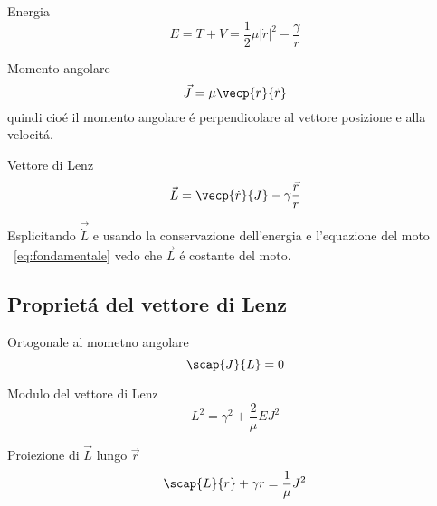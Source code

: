 \documentclass[oneside,12pt,fleqn]{memoir}
\begin{document}
\begin{enumerate*}

\item Energia\\
\begin{equation*}
E=T+V=\frac{1}{2}\mu|\dot{r}|^2-\frac{\gamma}{r}
\end{equation*}

\item Momento angolare\\
\begin{equation*}
\vec{J}=\mu\vecp{r}{\dot{r}}
\end{equation*}
quindi  cio\'e il momento angolare \'e perpendicolare al vettore posizione e alla velocit\'a.


\item Vettore di Lenz\\
\begin{equation*}\label{eq:lenzv}
\vec{L}=\vecp{\dot{r}}{J}-\gamma\frac{\vec{r}}{r}
\end{equation*}




\end{enumerate*}

Esplicitando $\vec{\dot{L}}$ e usando la conservazione dell'energia e l'equazione del moto ~\ref{eq:fondamentale} vedo che $\vec{L}$ \'e costante del moto.

\subsection{Propriet\'a del vettore di Lenz}

\begin{itemize*}
\item Ortogonale al mometno angolare
\begin{equation*}\label{eq:JLzero}
\scap{J}{L}=0
\end{equation*}

\item Modulo del vettore di Lenz
\begin{equation*}\label{eq:moduloL}
L^2=\gamma^2+\frac{2}{\mu}EJ^2
\end{equation*}

\item Proiezione di $\vec{L}$ lungo $\vec{r}$
\begin{equation*}\label{eq:Lr}
\scap{L}{r}+\gamma r=\frac{1}{\mu}J^2
\end{equation*}
\end{itemize*}
\end{document}
